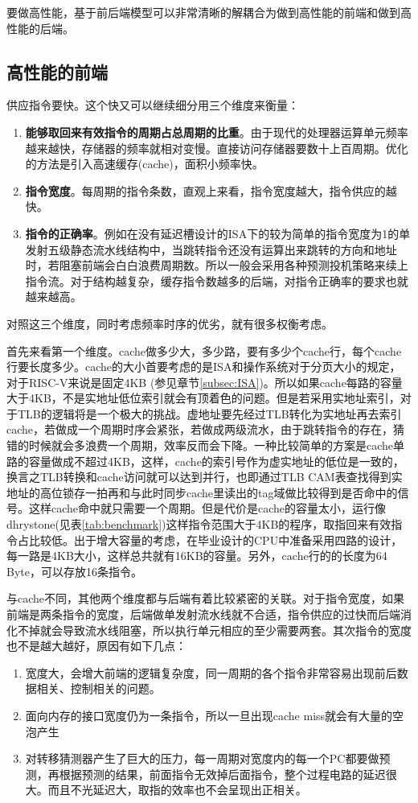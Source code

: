 要做高性能，基于前后端模型可以非常清晰的解耦合为做到高性能的前端和做到高性能的后端。
	\subsection{高性能的前端}
	
	供应指令要快。这个快又可以继续细分用三个维度来衡量：
	\begin{enumerate}[label=(\alph*)]
		\item \textbf{能够取回来有效指令的周期占总周期的比重}。由于现代的处理器运算单元频率越来越快，存储器的频率就相对变慢。直接访问存储器要数十上百周期。优化的方法是引入高速缓存(cache)，面积小频率快。
		\item \textbf{指令宽度}。每周期的指令条数，直观上来看，指令宽度越大，指令供应的越快。
		\item \textbf{指令的正确率}。例如在没有延迟槽设计的ISA下的较为简单的指令宽度为1的单发射五级静态流水线结构中，当跳转指令还没有运算出来跳转的方向和地址时，若阻塞前端会白白浪费周期数。所以一般会采用各种预测投机策略来续上指令流。对于结构越复杂，缓存指令数越多的后端，对指令正确率的要求也就越来越高。
	\end{enumerate}

	对照这三个维度，同时考虑频率时序的优劣，就有很多权衡考虑。
	
	首先来看第一个维度。cache做多少大，多少路，要有多少个cache行，每个cache行要长度多少。cache的大小首要考虑的是ISA和操作系统对于分页大小的规定，对于RISC-V来说是固定4KB (参见章节\ref{subsec:ISA})。所以如果cache每路的容量大于4KB，不是实地址低位索引就会有顶着色的问题。但是若采用实地址索引，对于TLB的逻辑将是一个极大的挑战。虚地址要先经过TLB转化为实地址再去索引cache，若做成一个周期时序会紧张，若做成两级流水，由于跳转指令的存在，猜错的时候就会多浪费一个周期，效率反而会下降。一种比较简单的方案是cache单路的容量做成不超过4KB，这样，cache的索引号作为虚实地址的低位是一致的，换言之TLB转换和cache访问就可以达到并行，也即通过TLB CAM表查找得到实地址的高位锁存一拍再和与此时同步cache里读出的tag域做比较得到是否命中的信号。这样cache命中就只需要一个周期。但是代价是cache的容量太小，运行像dhrystone(见表\ref{tab:benchmark})这样指令范围大于4KB的程序，取指回来有效指令占比较低。出于增大容量的考虑，在毕业设计的CPU中准备采用四路的设计，每一路是4KB大小，这样总共就有16KB的容量。另外，cache行的的长度为64 Byte，可以存放16条指令。
	
	与cache不同，其他两个维度都与后端有着比较紧密的关联。对于指令宽度，如果前端是两条指令的宽度，后端做单发射流水线就不合适，指令供应的过快而后端消化不掉就会导致流水线阻塞，所以执行单元相应的至少需要两套。其次指令的宽度也不是越大越好，原因有如下几点：
	\begin{enumerate}[label=(\alph*)]
		\item 宽度大，会增大前端的逻辑复杂度，同一周期的各个指令非常容易出现前后数据相关、控制相关的问题。
		\item 面向内存的接口宽度仍为一条指令，所以一旦出现cache miss就会有大量的空泡产生
		\item 对转移猜测器产生了巨大的压力，每一周期对宽度内的每一个PC都要做预测，再根据预测的结果，前面指令无效掉后面指令，整个过程电路的延迟很大。而且不光延迟大，取指的效率也不会呈现出正相关。
	\end{enumerate}
	
